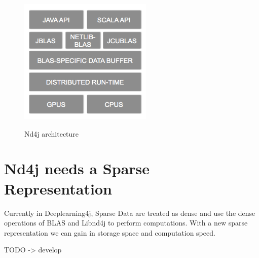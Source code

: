 \begin{figure}[h]
	\begin{center}
		\includegraphics[width=2.5in]{images/nd4j_architecture.png} 
		\label{fig:hierachy}
		\caption{Nd4j architecture}
	\end{center}
\end{figure}

\section{Nd4j needs a Sparse Representation}

Currently in Deeplearning4j, Sparse Data are treated as dense and use the dense operations of BLAS and Libnd4j to perform computations. With a new sparse representation we can gain in storage space and computation speed.


TODO -> develop 

